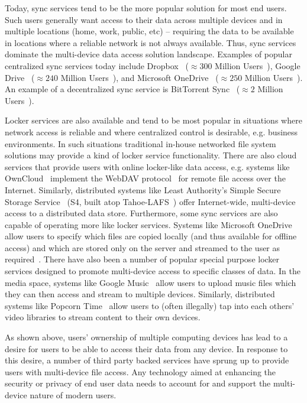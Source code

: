 Today, sync services tend to be the more popular solution for most end
users. Such users generally want access to their data across multiple
devices and in multiple locations (home, work, public, etc) --
requiring the data to be available in locations where a reliable
network is not always available. Thus, sync services dominate the
multi-device data access solution landscape. Examples of popular
centralized sync services today include Dropbox~\cite{dropbox}
($\approx300$ Million Users~\cite{smith-stats}), Google
Drive~\cite{google-drive} ($\approx240$ Million
Users~\cite{smith-stats}), and Microsoft
OneDrive~\cite{microsoft-onedrive} ($\approx250$ Million
Users~\cite{smith-stats}).  An example of a decentralized sync service
is BitTorrent Sync~\cite{bittorrent-sync} ($\approx2$ Million
Users~\cite{smith-stats}).

Locker services are also available and tend to be most popular in
situations where network access is reliable and where centralized
control is desirable, e.g. business environments. In such situations
traditional in-house networked file system solutions may provide a
kind of locker service functionality. There are also cloud services
that provide users with online locker-like data access, e.g. systems
like OwnCloud~\cite{owncloud} implement the WebDAV
protocol~\cite{goland1999} for remote file access over the
Internet. Similarly, distributed systems like Least Authority's Simple
Secure Storage Service~\cite{leastauthority-s4} (S4, built atop
Tahoe-LAFS~\cite{wilcox-o'hearn2008}) offer Internet-wide,
multi-device access to a distributed data store. Furthermore, some
sync services are also capable of operating more like locker
services. Systems like Microsoft OneDrive allow users to specify which
files are copied locally (and thus available for offline access) and
which are stored only on the server and streamed to the user as
required~\cite{microsoft-onedrive-online}. There have also been a
number of popular special purpose locker services designed to promote
multi-device access to specific classes of data. In the media space,
systems like Google Music~\cite{google-music} allow users to upload
music files which they can then access and stream to multiple
devices. Similarly, distributed systems like Popcorn
Time~\cite{popcorntime} allow users to (often illegally) tap into each
others' video libraries to stream content to their own devices.

As shown above, users' ownership of multiple computing devices has
lead to a desire for users to be able to access their data from any
device. In response to this desire, a number of third party backed
services have sprung up to provide users with multi-device file
access. Any technology aimed at enhancing the security or privacy of
end user data needs to account for and support the multi-device nature
of modern users.

